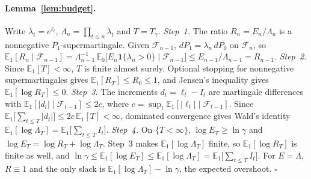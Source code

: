 \paragraph{Lemma~\ref{lem:budget}.}
Write $\lambda_t=e^{\ell_t}$, $\Lambda_n=\prod_{t\le n}\lambda_t$ and $T=T_\gamma$. \emph{Step~1.} The ratio $R_n=E_n/\Lambda_n$ is a nonnegative $P_1$-supermartingale. Given $\mathcal{F}_{n-1}$, $dP_1=\lambda_n\,dP_0$ on $\mathcal{F}_n$, so
$\mathbb{E}_1[R_n\mid\mathcal{F}_{n-1}]=\Lambda_{n-1}^{-1}\,\mathbb{E}_0\big[E_n\mathbf 1\{\lambda_n>0\}\mid\mathcal{F}_{n-1}\big]\le E_{n-1}/\Lambda_{n-1}=R_{n-1}.$
\emph{Step~2.} Since $\mathbb{E}_1[T]<\infty$, $T$ is finite almost surely. Optional stopping for nonnegative supermartingales gives $\mathbb{E}_1[R_T]\le R_0\le1$, and Jensen's inequality gives $\mathbb{E}_1[\log R_T]\le0$.
\emph{Step~3.} The increments $d_t=\ell_t-I_t$ are martingale differences with $\mathbb{E}_1[|d_t|\mid\mathcal{F}_{t-1}]\le2c$, where $c=\sup_t\mathbb{E}_1[|\ell_t|\mid\mathcal{F}_{t-1}]$. Since $\mathbb{E}_1\big[\sum_{t\le T}|d_t|\big]\le2c\,\mathbb{E}_1[T]<\infty$, dominated convergence gives Wald's identity $\mathbb{E}_1[\log\Lambda_T]=\mathbb{E}_1\big[\sum_{t\le T}I_t\big]$.
\emph{Step~4.} On $\{T<\infty\}$, $\log E_T\ge\ln\gamma$ and $\log E_T=\log R_T+\log\Lambda_T$. Step~3 makes $\mathbb{E}_1[\log\Lambda_T]$ finite, so $\mathbb{E}_1[\log R_T]$ is finite as well, and
$\ln\gamma\le\mathbb{E}_1[\log E_T]\le\mathbb{E}_1[\log\Lambda_T]=\mathbb{E}_1\big[\sum_{t\le T}I_t\big]$.
For $E=\Lambda$, $R\equiv1$ and the only slack is $\mathbb{E}_1[\log\Lambda_T]-\ln\gamma$, the expected overshoot. \hfill$\square$

